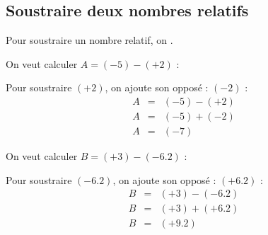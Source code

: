 \subsection{Soustraire deux nombres relatifs}

\begin{myprop}
	Pour soustraire un nombre relatif, on .
\end{myprop}

\begin{myexs}
	On veut calculer $A = (-\num{5}) - (+2)$ :
	
	Pour soustraire $(+2)$, on ajoute son opposé : $(-2)$ :
	\begin{eqnarray*}
		A &=& (-5) - (+2) \\
		A &=& (-5) + (-2) \\
		A &=& (- 7)
	\end{eqnarray*} 
	
	\vspace*{1cm}
	
	On veut calculer $B = (+\num{3}) - (-\num{6.2})$ :
	
	Pour soustraire $(-\num{6.2})$, on ajoute son opposé : $(+\num{6.2})$ :
	\begin{eqnarray*}
		B &=& (+\num{3}) - (-\num{6.2}) \\
		B &=& (+\num{3}) + (+\num{6.2}) \\
		B &=& (+ \num{9.2})
	\end{eqnarray*}  
\end{myexs}
